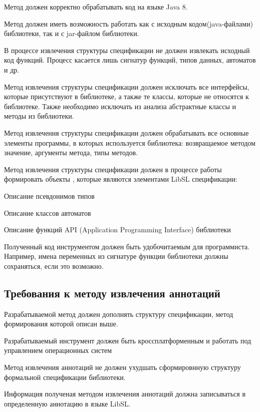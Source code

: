 Метод должен корректно обрабатывать код на языке Java 8.

Метод должен иметь возможность работать как с исходным кодом(java-файлами) библиотеки, так и с jar-файлом библиотеки.

В процессе извлечения структуры спецификации не должен извлекать исходный код функций. Процесс касается лишь сигнатур функций, типов данных, автоматов и др.

Метод извлечения структуры спецификации должен исключать все интерфейсы, которые присутствуют в библиотеке, а также те классы, которые не относятся к библиотеке.
Также необходимо исключать из анализа абстрактные классы и методы из библиотеки.

Метод извлечения структуры спецификации должен обрабатывать все основные элементы программы, в которых используется библиотека: возвращаемое методом значение, аргументы метода, типы методов.

Метод извлечения структуры спецификации должен в процессе работы формировать объекты , которые являются элементами LibSL спецификации:
%
\begin{itemize*}
\item Описание псевдонимов типов
\item Описание классов автоматов
\item Описание функций API (Application Programming Interface) библиотеки
\end{itemize*}
%

Полученный код инструментом должен быть удобочитаемым для программиста. Например, имена переменных из сигнатуре функции библиотеки должны сохраняться, если это возможно.

\subsection{Требования к методу извлечения аннотаций}

Разрабатываемой метод должен дополнять структуру спецификации, метод формирования которой описан выше.

Разрабатываемый инструмент должен быть кроссплатформенным и работать под управлением операционных систем

Метод извлечения аннотаций не должен ухудшать сформировнную структуру формальной спецификации библиотеки.

Информация полученая методом извлечения аннотаций должна записываться в определенную аннотацию в языке LibSL.

